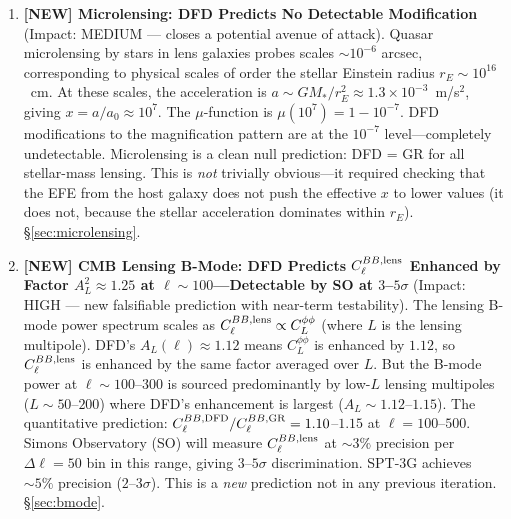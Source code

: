 \documentclass[11pt,a4paper]{article}
\newcommand{\ee}[1]{\times 10^{#1}}
\begin{document}
\begin{tcolorbox}[colback=yellow!5!white, colframe=red!70!black,
  title=\textbf{TOP 5 FINDINGS --- WAVE 4, ITERATION 17}]
\begin{enumerate}
\item \textbf{[NEW] Microlensing: DFD Predicts No Detectable Modification}
  (Impact: MEDIUM --- closes a potential avenue of attack).
  Quasar microlensing by stars in lens galaxies probes scales $\sim 10^{-6}$
  arcsec, corresponding to physical scales of order the stellar Einstein
  radius $r_E \sim 10^{16}$~cm.  At these scales, the acceleration is
  $a \sim GM_*/r_E^2 \approx 1.3\ee{-3}$~m/s$^2$, giving $x = a/a_0
  \approx 10^7$.  The $\mu$-function is $\mu(10^7) = 1 - 10^{-7}$.
  DFD modifications to the magnification pattern are at the $10^{-7}$
  level---completely undetectable.  Microlensing is a clean null
  prediction: DFD = GR for all stellar-mass lensing.  This is
  \emph{not} trivially obvious---it required checking that the EFE from
  the host galaxy does not push the effective $x$ to lower values (it
  does not, because the stellar acceleration dominates within $r_E$).
  \S\ref{sec:microlensing}.

\item \textbf{[NEW] CMB Lensing B-Mode: DFD Predicts $C_\ell^{BB,\rm lens}$
  Enhanced by Factor $A_L^2 \approx 1.25$ at $\ell \sim 100$---Detectable
  by SO at $3$--$5\sigma$} (Impact: HIGH --- new falsifiable prediction
  with near-term testability).
  The lensing B-mode power spectrum scales as $C_\ell^{BB,\rm lens}
  \propto C_L^{\phi\phi}$ (where $L$ is the lensing multipole).  DFD's
  $A_L(\ell) \approx 1.12$ means $C_L^{\phi\phi}$ is enhanced by $1.12$,
  so $C_\ell^{BB,\rm lens}$ is enhanced by the same factor averaged over
  $L$.  But the B-mode power at $\ell \sim 100$--$300$ is sourced
  predominantly by low-$L$ lensing multipoles ($L \sim 50$--$200$) where
  DFD's enhancement is largest ($A_L \sim 1.12$--$1.15$).  The
  quantitative prediction: $C_\ell^{BB,\rm DFD}/C_\ell^{BB,\rm GR}
  = 1.10$--$1.15$ at $\ell = 100$--$500$.  Simons Observatory (SO)
  will measure $C_\ell^{BB,\rm lens}$ at $\sim 3\%$ precision per
  $\Delta\ell = 50$ bin in this range, giving $3$--$5\sigma$
  discrimination.  SPT-3G achieves $\sim 5\%$ precision ($2$--$3\sigma$).
  This is a \emph{new} prediction not in any previous iteration.
  \S\ref{sec:bmode}.


\end{enumerate}
\end{tcolorbox}
\end{document}
